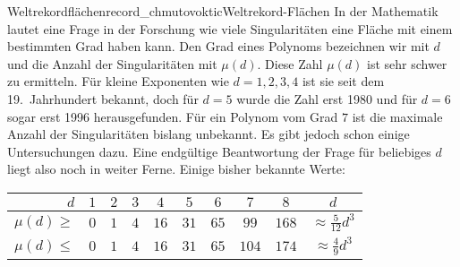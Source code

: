 \begin{surferIntroPage}{Weltrekordflächen}{record_chmutovoktic}{Weltrekord-Flächen}
    In der Mathematik lautet eine Frage in der Forschung wie viele Singularitäten eine Fläche mit einem bestimmten Grad haben kann. 
    Den Grad eines Polynoms bezeichnen wir mit $d$ und die Anzahl der Singularitäten mit $\mu(d)$. Diese Zahl $\mu(d)$ ist sehr schwer zu ermitteln. Für kleine Exponenten wie $d=1,2,3,4$ ist sie seit dem 19.\ Jahrhundert bekannt, doch für
    $d=5$ wurde die Zahl erst 1980 und für $d=6$ sogar erst 1996 herausgefunden.
    Für ein Polynom vom Grad $7$ ist die maximale Anzahl der Singularitäten bislang unbekannt. Es gibt jedoch schon einige Untersuchungen dazu.
    Eine endgültige Beantwortung der Frage für beliebiges $d$  liegt also noch in weiter Ferne.
    Einige bisher bekannte Werte:
    \begin{center}
      \begin{tabular}{r|cccccccc|c}
        $d$ & $1$ & $2$ & $3$ & $4$ & $5$ & $6$ & $7$ & $8$ & $d$\\
        \hline
        \hline
        \rule{0pt}{1.2em}$\mu(d)\ge$ & $0$ & $1$ & $4$ & $16$ & $31$ & $65$ &
        $99$ & $168$ & 
        $\approx \frac{5}{12}d^3$\\[0.3em]
        \hline
        \rule{0pt}{1.2em}$\mu(d)\le$ & $0$ & $1$ & $4$ & $16$ & $31$ & $65$ &
        $104$ & $174$ & $\approx \frac{4}{9}d^3$
      \end{tabular}
    \end{center}
\end{surferIntroPage}
